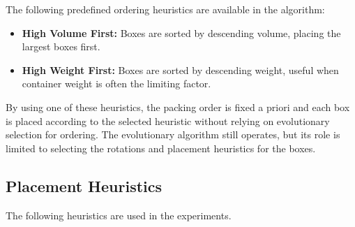 The following predefined ordering heuristics are available in the algorithm:

\begin{itemize}
    \item \textbf{High Volume First:} Boxes are sorted by descending volume, placing the largest boxes first.
    \item \textbf{High Weight First:} Boxes are sorted by descending weight, useful when container weight is often the limiting factor.
\end{itemize}

By using one of these heuristics, the packing order is fixed a priori and each box is placed according to the selected heuristic without relying on evolutionary selection for ordering. 
The evolutionary algorithm still operates, but its role is limited to selecting the rotations and placement heuristics for the boxes.

\subsection{Placement Heuristics}
\label{sec:placement-heuristics}

The following heuristics are used in the experiments.

